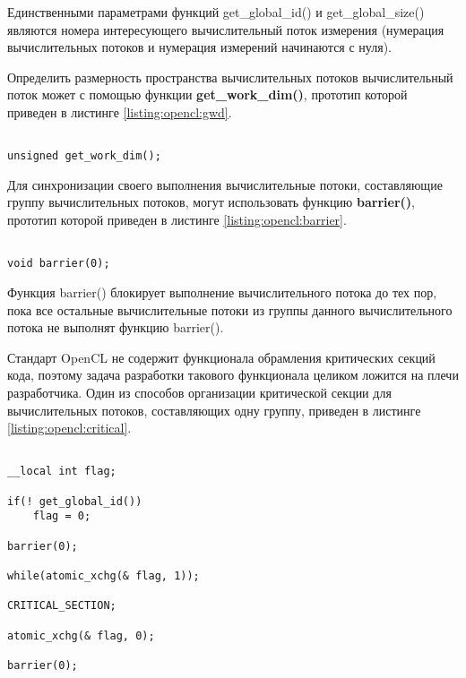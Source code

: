 		Единственными параметрами функций get\_global\_id() и get\_global\_size() являются номера интересующего вычислительный поток измерения (нумерация вычислительных потоков и нумерация измерений начинаются с нуля).

		Определить размерность пространства вычислительных потоков вычислительный поток может с помощью функции {\bf get\_work\_dim()}, прототип которой приведен в листинге \ref{listing:opencl:gwd}.

\begin{lstlisting}

unsigned get_work_dim();

\end{lstlisting}
\mylistingend


		Для синхронизации своего выполнения вычислительные потоки, составляющие группу вычислительных потоков, могут использовать функцию {\bf barrier()}, прототип которой приведен в листинге \ref{listing:opencl:barrier}.

\begin{lstlisting}

void barrier(0);

\end{lstlisting}
\mylistingend

		Функция barrier() блокирует выполнение вычислительного потока до тех пор, пока все остальные вычислительные потоки из группы данного вычислительного потока не выполнят функцию barrier().

		Стандарт OpenCL не содержит функционала обрамления критических секций кода, поэтому задача разработки такового функционала целиком ложится на плечи разработчика. Один из способов организации критической секции для вычислительных потоков, составляющих одну группу, приведен в листинге \ref{listing:opencl:critical}.

\begin{lstlisting}

__local int flag;

if(! get_global_id())
	flag = 0;

barrier(0);

while(atomic_xchg(& flag, 1));

CRITICAL_SECTION;

atomic_xchg(& flag, 0);

barrier(0);

\end{lstlisting}
\mylistingend

